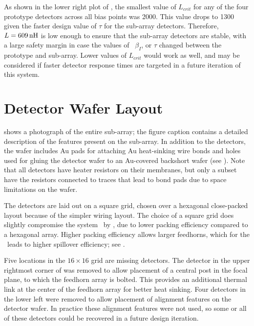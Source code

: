 As shown in the lower right plot of , the smallest value of $L_{crit}$ for any of the four prototype detectors across all bias points was \SI{2000}{\nH}.
This value drops to \SI{1300}{\nH} given the faster design value of $\tau$ for the sub-array detectors.
Therefore, $L = \SI{609}{\nH}$ is low enough to ensure that the sub-array detectors are stable, with a large safety margin in case the values of \Loop\, $\beta_I$, or $\tau$ changed between the prototype and sub-array.
Lower values of $L_{crit}$ would work as well, and may be considered if faster detector response times are targeted in a future iteration of this system.

\section{Detector Wafer Layout} \label{sec:ch5-layout}

 shows a photograph of the entire sub-array; the figure caption contains a detailed description of the features present on the sub-array.
In addition to the detectors, the wafer includes Au pads for attaching Au heat-sinking wire bonds and holes used for gluing the detector wafer to an Au-covered backshort wafer (see ).
Note that all detectors have heater resistors on their membranes, but only a subset have the resistors connected to traces that lead to bond pads due to space limitations on the wafer.

The detectors are laid out on a square grid, chosen over a hexagonal close-packed layout because of the simpler wiring layout.
The choice of a square grid does slightly compromise the system \NETD\ by , due to lower packing efficiency compared to a hexagonal array.
Higher packing efficiency allows larger feedhorns, which for the \Imager\ leads to higher spillover efficiency; see .


Five locations in the $16 \times 16$ grid are missing detectors.
The detector in the upper rightmost corner of  was removed to allow placement of a central post in the focal plane, to which the feedhorn array is bolted.
This provides an additional thermal link at the center of the feedhorn array for better heat sinking.
Four detectors in the lower left were removed to allow placement of alignment features on the detector wafer.
In practice these alignment features were not used, so some or all of these detectors could be recovered in a future design iteration.

